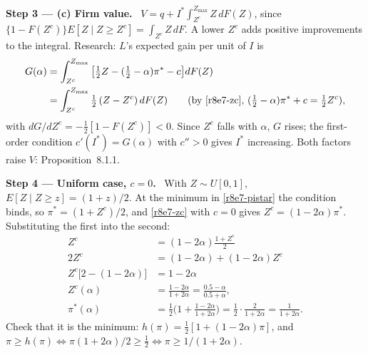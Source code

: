 \documentclass[11pt,a4paper]{article}
\newcommand{\step}[2]{\par\medskip\noindent\textbf{Step #1 --- #2.}~}
\begin{document}
\step{3}{(c) Firm value} $V=q+I^*\int_{Z^c}^{Z_{\max}}Z\,dF(Z)$, since $\{1-F(Z^c)\}E[Z\mid Z\ge Z^c]=\int_{Z^c}Z\,dF$. A lower $Z^c$ adds positive improvements to the integral. Research: $L$'s expected gain per unit of $I$ is
\begin{align}
  G(\alpha) &= \int_{Z^c}^{Z_{\max}}\big[\tfrac12Z-(\tfrac12-\alpha)\pi^*-c\big]dF(Z) \nonumber\\
  &= \int_{Z^c}^{Z_{\max}}\tfrac12\,(Z-Z^c)\,dF(Z) \qquad\text{(by \eqref{r8e7-zc}, } (\tfrac12-\alpha)\pi^*+c=\tfrac12Z^c\text{)}, \label{r8e7-G}
\end{align}
with $dG/dZ^c=-\tfrac12[1-F(Z^c)]<0$. Since $Z^c$ falls with $\alpha$, $G$ rises; the first-order condition $c'(I^*)=G(\alpha)$ with $c''>0$ gives $I^*$ increasing. Both factors raise $V$: Proposition~8.1.1.

\step{4}{Uniform case, $c=0$} With $Z\sim U[0,1]$, $E[Z\mid Z\ge z]=(1+z)/2$. At the minimum in \eqref{r8e7-pistar} the condition binds, so $\pi^*=(1+Z^c)/2$, and \eqref{r8e7-zc} with $c=0$ gives $Z^c=(1-2\alpha)\pi^*$. Substituting the first into the second:
\begin{align}
  Z^c &= (1-2\alpha)\frac{1+Z^c}{2} \nonumber\\
  2Z^c &= (1-2\alpha)+(1-2\alpha)Z^c \nonumber\\
  Z^c\big[2-(1-2\alpha)\big] &= 1-2\alpha \nonumber\\
  Z^c(\alpha) &= \frac{1-2\alpha}{1+2\alpha}=\frac{0.5-\alpha}{0.5+\alpha}, \label{r8e7-zcu}\\
  \pi^*(\alpha) &= \frac12\Big(1+\frac{1-2\alpha}{1+2\alpha}\Big)=\frac12\cdot\frac{2}{1+2\alpha}=\frac{1}{1+2\alpha}. \label{r8e7-piu}
\end{align}
Check that it is the minimum: $h(\pi)=\tfrac12[1+(1-2\alpha)\pi]$, and $\pi\ge h(\pi)\iff\pi(1+2\alpha)/2\ge\tfrac12\iff\pi\ge1/(1+2\alpha)$.
\end{document}
